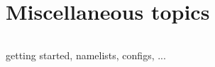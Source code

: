 \documentclass[../../tex_main/NEMO_manual]{subfiles}
\begin{document}

\chapter{Miscellaneous topics}
\label{chap:MIS}
\minitoc

\newpage
$\ $\newline    %

getting started, namelists, configs, ...
\end{document}
